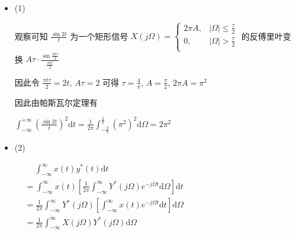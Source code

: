 \documentclass[a4paper,UTF8]{article}
\numberwithin{equation}{section}
\begin{document}
\begin{framed}
\begin{spacing}{1.5}
    \begin{itemize}
      \item (1)

      观察可知 $\displaystyle \frac{\sin 2t}{t}$ 为一个矩形信号 $X(j \Omega) = \begin{cases}
          2\pi A, & |\Omega| \le \frac{\tau}{2} \\
          0, & |\Omega| > \frac{\tau}{2} \\
      \end{cases}$ 的反傅里叶变换 $\displaystyle A\tau \cdot \frac{\sin \frac{\pi t \tau}{2}}{\frac{\pi t \tau}{2}}$
      
      因此令 $\displaystyle \frac{\pi t \tau}{2} = 2t$, $\displaystyle A\tau = 2$ 可得 $\displaystyle \tau = \frac{4}{\pi}$, $\displaystyle A = \frac{\pi}{2}$, $\displaystyle 2\pi A = \pi^{2}$
      
      因此由帕斯瓦尔定理有
      
      $\displaystyle \int_{-\infty}^{+\infty}\left( \frac{\sin 2t}{t} \right)^{2}\mathrm{d}t = \frac{1}{2\pi}\int_{-\frac{2}{\pi}}^{\frac{2}{\pi}}(\pi^{2})^{2}\mathrm{d}\Omega = 2 \pi^{2}$
      
      \item (2)
      
      $
      \begin{aligned}
      &\quad\ \int_{-\infty}^{\infty}x(t)y^{*}(t)\mathrm{d}t  \\
      &= \int_{-\infty}^{\infty}x(t)[\frac{1}{2\pi}\int_{-\infty}^{\infty}Y^{*}(j\Omega)e^{-j\Omega t}\mathrm{d}\Omega]\mathrm{d}t  \\
      &= \frac{1}{2\pi}\int_{-\infty}^{\infty}Y^{*}(j\Omega)[\int_{-\infty}^{\infty}x(t)e^{-j\Omega t}\mathrm{d}t]\mathrm{d}\Omega  \\
      &= \frac{1}{2\pi}\int_{-\infty}^{\infty}X(j\Omega)Y^{*}(j\Omega)\mathrm{d}\Omega  \\
      \end{aligned}
      $
    \end{itemize}
\end{spacing}
\end{framed}


\newpage
\end{document}

